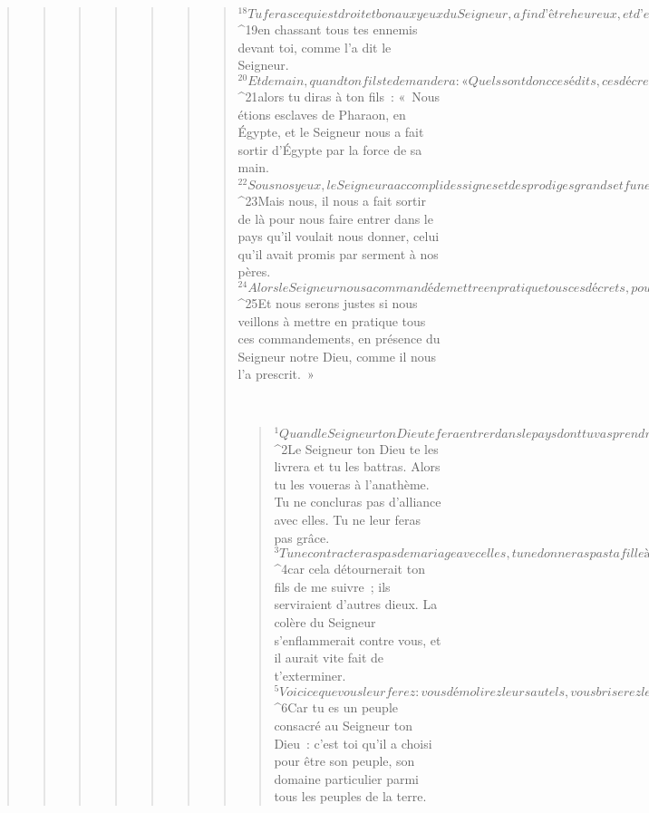 \begin{verse}
\begin{verse}
\begin{verse}
\begin{verse}
\begin{verse}
\begin{verse}
\begin{verse}
${}^{18}Tu feras ce qui est droit et bon aux yeux du Seigneur, afin d’être heureux, et d’entrer, pour en prendre possession, dans le bon pays que le Seigneur a juré de donner à tes pères, 
${}^{19}en chassant tous tes ennemis devant toi, comme l’a dit le Seigneur.
${}^{20}Et demain, quand ton fils te demandera : « Quels sont donc ces édits, ces décrets et ces ordonnances que le Seigneur notre Dieu vous a prescrits ? », 
${}^{21}alors tu diras à ton fils : « Nous étions esclaves de Pharaon, en Égypte, et le Seigneur nous a fait sortir d’Égypte par la force de sa main. 
${}^{22}Sous nos yeux, le Seigneur a accompli des signes et des prodiges grands et funestes contre l’Égypte, Pharaon et toute sa maison. 
${}^{23}Mais nous, il nous a fait sortir de là pour nous faire entrer dans le pays qu’il voulait nous donner, celui qu’il avait promis par serment à nos pères. 
${}^{24}Alors le Seigneur nous a commandé de mettre en pratique tous ces décrets, pour que nous craignions le Seigneur notre Dieu : ainsi, nous serons toujours heureux et il nous gardera en vie comme nous le sommes aujourd’hui. 
${}^{25}Et nous serons justes si nous veillons à mettre en pratique tous ces commandements, en présence du Seigneur notre Dieu, comme il nous l’a prescrit. »
      
         
      \bchapter{}
      \begin{verse}
${}^{1}Quand le Seigneur ton Dieu te fera entrer dans le pays dont tu vas prendre possession, il expulsera devant toi des nations nombreuses, le Hittite, le Guirgashite, l’Amorite, le Cananéen, le Perizzite, le Hivvite et le Jébuséen, sept nations plus nombreuses et plus puissantes que toi. 
${}^{2}Le Seigneur ton Dieu te les livrera et tu les battras. Alors tu les voueras à l’anathème. Tu ne concluras pas d’alliance avec elles. Tu ne leur feras pas grâce. 
${}^{3}Tu ne contracteras pas de mariage avec elles, tu ne donneras pas ta fille à leur fils, tu ne prendras pas leur fille pour la donner à ton fils, 
${}^{4}car cela détournerait ton fils de me suivre ; ils serviraient d’autres dieux. La colère du Seigneur s’enflammerait contre vous, et il aurait vite fait de t’exterminer. 
${}^{5}Voici ce que vous leur ferez : vous démolirez leurs autels, vous briserez leurs stèles, vous abattrez leurs poteaux sacrés et vous brûlerez leurs idoles. 
${}^{6}Car tu es un peuple consacré au Seigneur ton Dieu : c’est toi qu’il a choisi pour être son peuple, son domaine particulier parmi tous les peuples de la terre.
      

\end{verse}
\end{verse}
\end{verse}
\end{verse}
\end{verse}
\end{verse}
\end{verse}
\end{verse}
